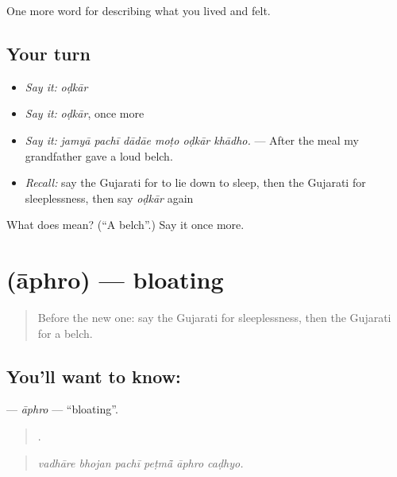 \begin{grammarlens}[title={What you've built}]
One more word for describing what you lived and felt.
\end{grammarlens}

\subsection*{Your turn}
\begin{itemize}
\raggedright
  \item \emph{Say it:} \emph{oḍkār}
  \item \emph{Say it:} \emph{oḍkār}, once more
  \item \emph{Say it:} \emph{jamyā pachī dādāe moṭo oḍkār khādho.} — After the meal my grandfather gave a loud belch.
  \item \emph{Recall:} say the Gujarati for to lie down to sleep, then the Gujarati for sleeplessness, then say \emph{oḍkār} again
\end{itemize}

\begin{tcolorbox}[breakable,colback=teal!4,colframe=teal!35!black,title={Before you move on}]
What does  mean? (\textquotedblleft{}A belch\textquotedblright{}.) Say it once more.
\end{tcolorbox}
\section[\texorpdfstring{\gu{આફરો} (āphro)}{આફરો (āphro)}]{ (āphro) — bloating}

\label{lesson:GU-C477-aphro}



\begin{quote}
Before the new one: say the Gujarati for sleeplessness, then the Gujarati for a belch.
\end{quote}

\subsection*{You'll want to know: }
\textbf{} — \emph{āphro} — \textquotedblleft{}bloating\textquotedblright{}.

\begin{quote}
     .
\end{quote}

\begin{quote}
\emph{vadhāre bhojan pachī peṭmā̃ āphro caḍhyo.}
\end{quote}

